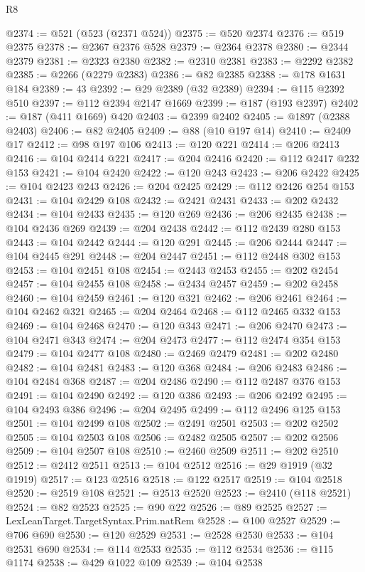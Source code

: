 \begin{lexlean}{R8}
\begin{coremodule}
@2374 := @521 (@523 (@2371 @524))
@2375 := @520 @2374
@2376 := @519 @2375
@2378 := @2367 @2376 @528
@2379 := @2364 @2378
@2380 := @2344 @2379
@2381 := @2323 @2380
@2382 := @2310 @2381
@2383 := @2292 @2382
@2385 := @2266 (@2279 @2383)
@2386 := @82 @2385
@2388 := @178 @1631 @184
@2389 := 43
@2392 := @29 @2389 (@32 @2389)
@2394 := @115 @2392 @510
@2397 := @112 @2394 @2147 @1669
@2399 := @187 (@193 @2397)
@2402 := @187 (@411 @1669) @420
@2403 := @2399 @2402
@2405 := @1897 (@2388 @2403)
@2406 := @82 @2405
@2409 := @88 (@10 @197 @14)
@2410 := @2409 @17
@2412 := @98 @197 @106
@2413 := @120 @221
@2414 := @206 @2413
@2416 := @104 @2414 @221
@2417 := @204 @2416
@2420 := @112 @2417 @232 @153
@2421 := @104 @2420
@2422 := @120 @243
@2423 := @206 @2422
@2425 := @104 @2423 @243
@2426 := @204 @2425
@2429 := @112 @2426 @254 @153
@2431 := @104 @2429 @108
@2432 := @2421 @2431
@2433 := @202 @2432
@2434 := @104 @2433
@2435 := @120 @269
@2436 := @206 @2435
@2438 := @104 @2436 @269
@2439 := @204 @2438
@2442 := @112 @2439 @280 @153
@2443 := @104 @2442
@2444 := @120 @291
@2445 := @206 @2444
@2447 := @104 @2445 @291
@2448 := @204 @2447
@2451 := @112 @2448 @302 @153
@2453 := @104 @2451 @108
@2454 := @2443 @2453
@2455 := @202 @2454
@2457 := @104 @2455 @108
@2458 := @2434 @2457
@2459 := @202 @2458
@2460 := @104 @2459
@2461 := @120 @321
@2462 := @206 @2461
@2464 := @104 @2462 @321
@2465 := @204 @2464
@2468 := @112 @2465 @332 @153
@2469 := @104 @2468
@2470 := @120 @343
@2471 := @206 @2470
@2473 := @104 @2471 @343
@2474 := @204 @2473
@2477 := @112 @2474 @354 @153
@2479 := @104 @2477 @108
@2480 := @2469 @2479
@2481 := @202 @2480
@2482 := @104 @2481
@2483 := @120 @368
@2484 := @206 @2483
@2486 := @104 @2484 @368
@2487 := @204 @2486
@2490 := @112 @2487 @376 @153
@2491 := @104 @2490
@2492 := @120 @386
@2493 := @206 @2492
@2495 := @104 @2493 @386
@2496 := @204 @2495
@2499 := @112 @2496 @125 @153
@2501 := @104 @2499 @108
@2502 := @2491 @2501
@2503 := @202 @2502
@2505 := @104 @2503 @108
@2506 := @2482 @2505
@2507 := @202 @2506
@2509 := @104 @2507 @108
@2510 := @2460 @2509
@2511 := @202 @2510
@2512 := @2412 @2511
@2513 := @104 @2512
@2516 := @29 @1919 (@32 @1919)
@2517 := @123 @2516
@2518 := @122 @2517
@2519 := @104 @2518
@2520 := @2519 @108
@2521 := @2513 @2520
@2523 := @2410 (@118 @2521)
@2524 := @82 @2523
@2525 := @90 @22
@2526 := @89 @2525
@2527 := LexLeanTarget.TargetSyntax.Prim.natRem
@2528 := @100 @2527
@2529 := @706 @690
@2530 := @120 @2529
@2531 := @2528 @2530
@2533 := @104 @2531 @690
@2534 := @114 @2533
@2535 := @112 @2534
@2536 := @115 @1174
@2538 := @429 @1022 @109
@2539 := @104 @2538

\end{coremodule}
\end{lexlean}
